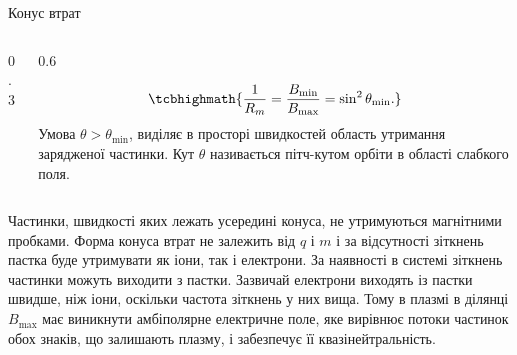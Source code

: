 \documentclass[]{beamer}
\begin{document}
\begin{frame}{Конус втрат}{}
	\begin{columns}
		\begin{column}{0.3\linewidth}
			\begin{center}
				
			\end{center}
		\end{column}
		\quad%
		\begin{column}{0.6\linewidth}
			\begin{block}{}\justifying
				\begin{equation*}
					\tcbhighmath{
						\frac1{R_m} = \frac{B_{\min}}{B_{\max}} = \sin^2\theta_{\min}.
					}
				\end{equation*}
				Умова $\theta > \theta_{\min}$, виділяє в просторі швидкостей область утримання зарядженої частинки. Кут $\theta$ називається \alert{пітч-кутом орбіти в області слабкого поля}.
			\end{block}
		\end{column}
	\end{columns}
	\begin{block}{}\justifying\scriptsize
		Частинки, швидкості яких лежать усередині конуса, не утримуються магнітними пробками. Форма конуса втрат не залежить від $q$ і $m$ і за відсутності зіткнень пастка буде утримувати як іони, так і електрони. За наявності в системі зіткнень частинки можуть виходити з пастки.  Зазвичай електрони виходять із пастки швидше, ніж іони, оскільки частота зіткнень у них вища. Тому в плазмі в ділянці $B_{\max}$ має виникнути \alert{амбіполярне електричне поле}, яке вирівнює потоки частинок обох знаків, що залишають плазму, і забезпечує її квазінейтральність.
	\end{block}
\end{frame}
\end{document}
